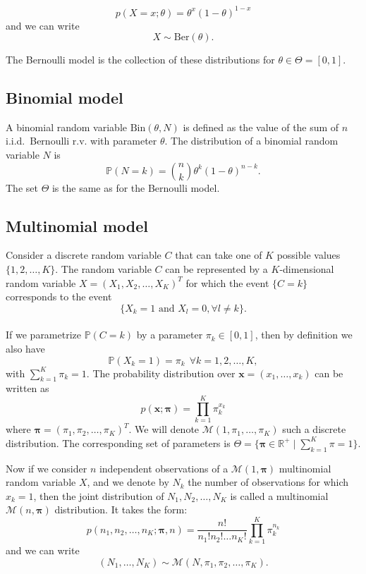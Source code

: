 \documentclass[12pt]{report}	%
\newcommand{\Ber}{\mathrm{Ber}}
\def\RR{\mathbb{R}}
\def\PP{\mathbb{P}}
\def\xb{\mathbf{x}}
\begin{document}
\begin{equation}
\label{eq:bernoulli}
p(X=x;\theta) = \theta^x(1-\theta)^{1-x}
\end{equation}
and we can write
\begin{equation}
X \sim \Ber(\theta).
\end{equation}

The Bernoulli model is the collection of these distributions for $\theta \in \Theta=[0,1]$.
\subsection{Binomial model}
A binomial random variable $\text{Bin}(\theta, N)$ is defined as the value of the sum of $n$ i.i.d.\ Bernoulli r.v. with parameter $\theta$. The distribution of a binomial random variable $N$ is 
$$\PP(N=k)=\binom{n}{k} {\theta}^k (1-\theta)^{n-k}.$$
The set $\Theta$ is the same as for the Bernoulli model.
\subsection{Multinomial model}
\label{subsec:multinomial}
Consider a discrete random variable $C$ that can take one of $K$ possible values $\{1,2,\ldots,K\}$. The random variable $C$ can be represented by a $K$-dimensional random variable $X=(X_1,X_2,\ldots,X_K)^T$ for which the event $\{C=k\}$ corresponds to the event $$\{X_k=1 \text{ and } X_l=0, \forall l \neq k\}.$$ \\
If we parametrize $\PP(C=k)$ by a parameter $\pi_k \in [0,1]$, then by definition we also have 
\begin{equation*}
\PP(X_k=1) = \pi_k \ \ \forall k=1,2,\ldots,K,
\end{equation*}
with $\sum_{k=1}^K \pi_k=1$. The probability distribution over $\xb=(x_1,\ldots, x_k)$ can be written as
\begin{equation}
\label{eq:multinomial}
p(\mathbf{x};\bm{\pi})=\prod_{k=1}^K\pi_k^{x_k}
\end{equation}
where $\bm{\pi}=(\pi_1,\pi_2,\ldots,\pi_K)^T$.  We will denote $\mathcal{M}(1,\pi_1, \ldots, \pi_K)$ such a discrete distribution. The corresponding set of parameters is $\Theta=\{\bm{\pi} \in \RR^+ \mid \sum_{k=1}^K \pi =1\}.$

Now if we consider $n$ independent observations of a $\mathcal{M}(1,\bm{\pi})$ multinomial random variable $X$, and we denote by $N_k$ the number of observations for which $x_k=1$, then the joint distribution of $N_1,N_2,\ldots,N_K$ is called a multinomial $\mathcal{M}(n,\bm{\pi})$ distribution. It takes the form:
\begin{equation}
p(n_1,n_2,\ldots,n_K;\bm{\pi},n)=\frac{n!}{n_1!n_2!\ldots n_K!} \prod_{k=1}^K\pi_k^{n_k}
\end{equation}
and we can write
\begin{equation}
(N_1,\ldots,N_K) \sim \mathcal{M}(N,\pi_1,\pi_2,\ldots,\pi_K).
\end{equation}
\end{document}
